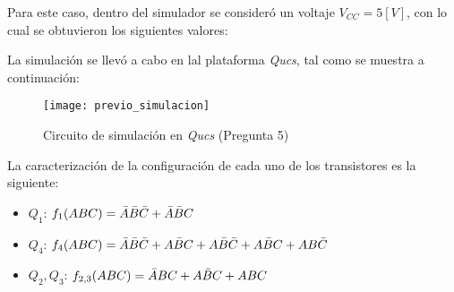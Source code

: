 \documentclass[../procedimientos.tex]{subfiles}
\begin{document}
Para este caso, dentro del simulador se consideró un voltaje $V_{CC} = 5 [V]$, 
con lo cual se obtuvieron los siguientes valores:

\begin{table}[H]
  \centering
  \caption{Voltajes de la simulación (Pregunta 5)}
\end{table}

La simulación se llevó a cabo en lal plataforma \textit{Qucs}, tal como se 
muestra a continuación:
\begin{figure}[H]
  \centering
  \texttt{[image: previo\_simulacion]}
  \caption{Circuito de simulación en \textit{Qucs} (Pregunta 5)}
\end{figure}

La caracterización de la configuración de cada uno de los transistores es la 
siguiente:
\begin{itemize}
  \item $Q_1$: $f_1(ABC) = \bar{A}\bar{B}\bar{C} + \bar{A}\bar{B}C$
  \item $Q_4$: $f_4(ABC) = \bar{A}\bar{B}\bar{C} + A\bar{B}C+A\bar{B}\bar{C} + 
    A\bar{B}C + AB\bar{C}$
  \item $Q_2, Q_3$: $f_{2,3}(ABC) = \bar{A}BC + A\bar{B}C + ABC$

\end{itemize}
\end{document}
